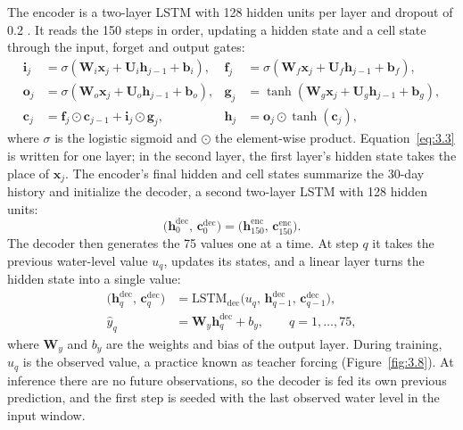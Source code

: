 The encoder is a two-layer LSTM \cite{HochreiterSchmidhuber1997} with 128
hidden units per layer and dropout of 0.2 \cite{Srivastava2014}. It reads the
150 steps in order, updating a hidden state and a cell state through the input,
forget and output gates:
\begin{equation}
\begin{aligned}
  \mathbf{i}_j &= \sigma(\mathbf{W}_i \mathbf{x}_j + \mathbf{U}_i \mathbf{h}_{j-1} + \mathbf{b}_i), &
  \mathbf{f}_j &= \sigma(\mathbf{W}_f \mathbf{x}_j + \mathbf{U}_f \mathbf{h}_{j-1} + \mathbf{b}_f),\\
  \mathbf{o}_j &= \sigma(\mathbf{W}_o \mathbf{x}_j + \mathbf{U}_o \mathbf{h}_{j-1} + \mathbf{b}_o), &
  \mathbf{g}_j &= \tanh(\mathbf{W}_g \mathbf{x}_j + \mathbf{U}_g \mathbf{h}_{j-1} + \mathbf{b}_g),\\
  \mathbf{c}_j &= \mathbf{f}_j \odot \mathbf{c}_{j-1} + \mathbf{i}_j \odot \mathbf{g}_j, &
  \mathbf{h}_j &= \mathbf{o}_j \odot \tanh(\mathbf{c}_j),
\end{aligned}
\label{eq:3.3}
\end{equation}
where $\sigma$ is the logistic sigmoid and $\odot$ the element-wise product.
Equation~\eqref{eq:3.3} is written for one layer; in the second layer, the first
layer's hidden state takes the place of $\mathbf{x}_j$. The encoder's final
hidden and cell states summarize the 30-day history and initialize the decoder,
a second two-layer LSTM with 128 hidden units:
\begin{equation}
  \big(\mathbf{h}^{\mathrm{dec}}_0,\, \mathbf{c}^{\mathrm{dec}}_0\big) = \big(\mathbf{h}^{\mathrm{enc}}_{150},\, \mathbf{c}^{\mathrm{enc}}_{150}\big).
  \label{eq:3.4}
\end{equation}
The decoder then generates the 75 values one at a time. At step $q$ it takes
the previous water-level value $u_q$, updates its states, and a linear layer
turns the hidden state into a single value:
\begin{equation}
\begin{aligned}
  \big(\mathbf{h}^{\mathrm{dec}}_q,\, \mathbf{c}^{\mathrm{dec}}_q\big) &= \mathrm{LSTM}_{\mathrm{dec}}\big(u_q,\, \mathbf{h}^{\mathrm{dec}}_{q-1},\, \mathbf{c}^{\mathrm{dec}}_{q-1}\big),\\
  \hat{y}_q &= \mathbf{W}_y \mathbf{h}^{\mathrm{dec}}_q + b_y, \qquad q = 1, \dots, 75,
\end{aligned}
\label{eq:3.5}
\end{equation}
where $\mathbf{W}_y$ and $b_y$ are the weights and bias of the output layer.
During training, $u_q$ is the observed value, a practice known as teacher
forcing (Figure~\ref{fig:3.8}). At inference there are no future observations,
so the decoder is fed its own previous prediction, and the first step is seeded
with the last observed water level in the input window.

